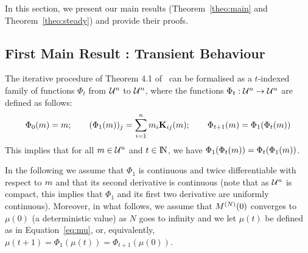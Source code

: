 \documentclass{elsarticle}
\begin{document}
In this section, we present our main results (Theorem~\ref{theo:main}
and Theorem~\ref{theo:steady}) and provide their proofs.

\subsection{First Main Result : Transient Behaviour}

The iterative procedure of Theorem 4.1 of~\cite{Le+07}  can be
formalised as a $t$-indexed family of functions $\Phi_t$ from
${\cal U}^n$ to ${\cal U}^n$, where the functions
$\Phi_t: {\cal U}^n \rightarrow {\cal U}^n$ are defined as follows:
\begin{align*}
  \Phi_{0}(m) = m; \qquad {\displaystyle (\Phi_1(m))_j =
  \sum_{i=1}^n m_i \mathbf{K}_{ij}(m)};
  \qquad \Phi_{t+1}(m) = \Phi_1(\Phi_t(m))
\end{align*}
This implies that for all $m \in {\cal U}^n$ and $t \in \mathrm{I\!N}$, we
have $\Phi_1(\Phi_t(m))= \Phi_t(\Phi_1(m))$.

In the following we assume that $\Phi_{1}$ is continuous and twice
differentiable with respect to $m$ and that its second derivative
is continuous (note that as ${\cal U}^n$ is compact, this implies that
$\Phi_1$ and its first two derivative are uniformly continuous).
Moreover, in what follows, we assume that $M^{(N)}(0)$ converges to
$\mu(0)$ (a deterministic value) as $N$ goes to infinity and we let
$\mu(t)$ be defined as in Equation~\eqref{eq:mu}, or, equivalently,
$\mu(t+1)=\Phi_1(\mu(t))=\Phi_{t+1}(\mu(0))$.
\end{document}
